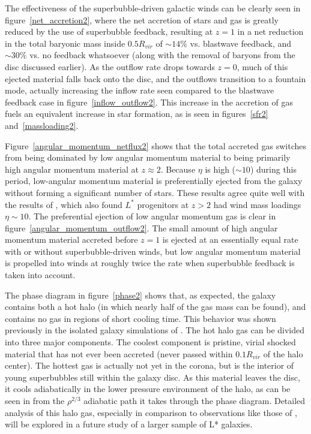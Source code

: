 The effectiveness of the superbubble-driven galactic winds can be clearly seen
in figure~\ref{net_accretion2}, where the net accretion of stars and gas is
greatly reduced by the use of superbubble feedback, resulting at $z=1$ in a net
reduction in the total baryonic mass inside $0.5R_{vir}$ of $\sim14\%$ vs.
blastwave feedback, and $\sim30\%$ vs. no feedback whatsoever (along with the 
removal of baryons from the disc discussed earlier). As the outflow
rate drops towards $z=0$, much of this ejected material falls back onto the
disc, and the outflows transition to a fountain mode, actually increasing
the inflow rate seen compared to the blastwave feedback case in
figure~\ref{inflow_outflow2}.  This increase in the accretion of gas fuels an
equivalent increase in star formation, as is seen in figures~\ref{sfr2}
and~\ref{massloading2}.

Figure~\ref{angular_momentum_netflux2} shows that the total accreted gas switches
from being dominated by low angular momentum material to being primarily high
angular momentum material at $z\approx2$.  Because $\eta$ is high ($\sim 10$)
during this period, low-angular momentum material is preferentially ejected from
the galaxy without forming a significant number of stars.  These results agree
quite well with the results of \citet{Muratov2015}, which also found $L^*$
progenitors at $z>2$ had wind mass loadings $\eta\sim 10$. The preferential
ejection of low angular momentum gas is clear in
figure~\ref{angular_momentum_outflow2}.  The small amount of high angular
momentum material accreted before $z=1$ is ejected at an essentially equal rate
with or without superbubble-driven winds, but low angular momentum material is
propelled into winds at roughly twice the rate when superbubble feedback is
taken into account.

The phase diagram in figure~\ref{phase2} shows that, as expected, the galaxy
contains both a hot halo (in which nearly half of the gas mass can be found),
and contains no gas in regions of short cooling time.  This behavior was shown
previously in the isolated galaxy simulations of \citet{Keller2014}.  The hot
halo gas can be divided into three major components. The coolest component is
pristine, virial shocked material that has not ever been accreted (never passed
within $0.1R_{vir}$ of the halo center).  The hottest gas is actually not yet in
the corona, but is the interior of young superbubbles still within the galaxy
disc.  As this material leaves the disc, it cools adiabatically in the lower
pressure environment of the halo, as can be seen in from the $\rho^{2/3}$
adiabatic path it takes through the phase diagram.  Detailed analysis of this
halo gas, especially in comparison to observations like those of
\citet{Steidel2010}, will be explored in a future study of a larger sample of
L* galaxies.

